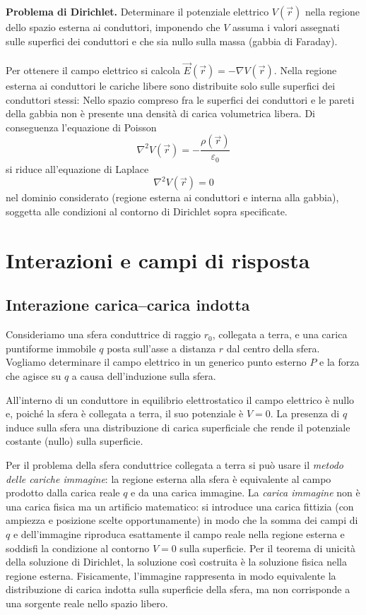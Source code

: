 \documentclass{book}
\begin{document}
\noindent\textbf{Problema di Dirichlet.} Determinare il potenziale elettrico \(V(\vec r)\) nella regione dello spazio esterna ai conduttori, imponendo che \(V\) assuma i valori assegnati sulle superfici dei conduttori e che sia nullo sulla massa (gabbia di Faraday).
\\
\\
Per ottenere il campo elettrico si calcola \(\vec{E}(\vec r)=-\nabla V(\vec r)\). Nella regione esterna ai conduttori le cariche libere sono distribuite solo sulle superfici dei conduttori stessi: Nello spazio compreso fra le superfici dei conduttori e le pareti della gabbia non è presente una densità di carica volumetrica libera. Di conseguenza l'equazione di Poisson
\[
\nabla^2 V(\vec r) = -\frac{\rho(\vec r)}{\varepsilon_0}
\]
si riduce all'equazione di Laplace
\[
\nabla^2 V(\vec r)=0
\]
nel dominio considerato (regione esterna ai conduttori e interna alla gabbia), soggetta alle condizioni al contorno di Dirichlet sopra specificate.


\chapter{Interazioni e campi di risposta}
\section{Interazione carica--carica indotta}


Consideriamo una sfera conduttrice di raggio $r_0$, collegata a terra, e una carica puntiforme immobile $q$ posta sull'asse a distanza $r$ dal centro della sfera. Vogliamo determinare il campo elettrico in un generico punto esterno $P$ e la forza che agisce su $q$ a causa dell'induzione sulla sfera.

All'interno di un conduttore in equilibrio elettrostatico il campo elettrico è nullo e, poiché la sfera è collegata a terra, il suo potenziale è $V=0$. La presenza di $q$ induce sulla sfera una distribuzione di carica superficiale che rende il potenziale costante (nullo) sulla superficie.

Per il problema della sfera conduttrice collegata a terra si può usare il \emph{metodo delle cariche immagine}: la regione esterna alla sfera è equivalente al campo prodotto dalla carica reale $q$ e da una carica immagine.  
La \emph{carica immagine} non è una carica fisica ma un artificio matematico: si introduce una carica fittizia (con ampiezza e posizione scelte opportunamente) in modo che la somma dei campi di $q$ e dell'immagine riproduca esattamente il campo reale nella regione esterna e soddisfi la condizione al contorno $V=0$ sulla superficie. Per il teorema di unicità della soluzione di Dirichlet, la soluzione così costruita è la soluzione fisica nella regione esterna. Fisicamente, l'immagine rappresenta in modo equivalente la distribuzione di carica indotta sulla superficie della sfera, ma non corrisponde a una sorgente reale nello spazio libero.
\end{document}
